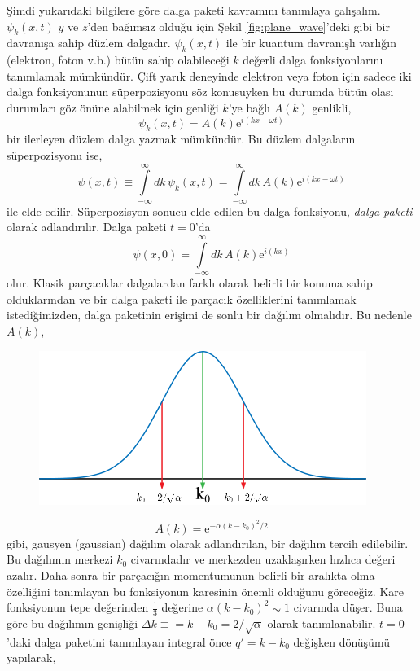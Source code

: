 \documentclass[a4paper,12pt, twoside]{article}
\begin{document}
Şimdi yukarıdaki bilgilere göre dalga paketi kavramını tanımlaya çalışalım. $\psi_k(x,t)$ $y$ ve $z$'den bağımsız olduğu için Şekil \ref{fig:plane_wave}'deki gibi bir davranışa sahip düzlem dalgadır. $\psi_k(x,t)$ ile bir kuantum davranışlı varlığın (elektron, foton v.b.) bütün sahip olabileceği $k$ değerli dalga fonksiyonlarını tanımlamak mümkündür. Çift yarık deneyinde elektron veya foton için sadece iki dalga fonksiyonunun süperpozisyonu söz konusuyken bu durumda bütün olası durumları göz önüne alabilmek için genliği $k$'ye bağlı $A(k)$ genlikli,
\begin{equation}
\psi_k(x, t) = A(k) \text{e}^{i(kx - \omega t)} 
\label{eq:plane_wave_A_k}
\end{equation}
bir ilerleyen düzlem dalga yazmak mümkündür. Bu düzlem dalgaların süperpozisyonu ise,
\begin{equation}
\psi(x, t) \equiv \int\limits_{-\infty}^{\infty}dk\,\psi_k(x, t) = \int\limits_{-\infty}^{\infty}dk\,A(k) \text{e}^{i(kx - \omega t)} 
\label{eq:wave_packet}
\end{equation}
ile elde edilir. Süperpozisyon sonucu elde edilen bu dalga fonksiyonu, \emph{dalga paketi} olarak adlandırılır. Dalga paketi $t=0$'da
\begin{equation}
\psi(x, 0) = \int\limits_{-\infty}^{\infty}dk\,A(k) \text{e}^{i(kx)} 
\label{eq:wave_packet_t0_int}
\end{equation}
olur. Klasik parçacıklar dalgalardan farklı olarak belirli bir konuma sahip olduklarından ve bir dalga paketi ile parçacık özelliklerini tanımlamak istediğimizden, dalga paketinin erişimi de sonlu bir dağılım olmalıdır. Bu nedenle $A(k)$,
\begin{figure}[hbtp]
\center
\includegraphics[scale=1.5]{Gaussian_distribution.png}
\end{figure}
\begin{equation}
A(k) = \text{e}^{-\alpha (k-k_0)^2/2}
\label{eq:wave_packet_t0}
\end{equation}
gibi, gausyen (gaussian) dağılım olarak adlandırılan, bir dağılım tercih edilebilir. Bu dağılımın merkezi $k_0$ civarındadır ve merkezden uzaklaşırken hızlıca değeri azalır. Daha sonra bir parçacığın momentumunun belirli bir aralıkta olma özelliğini tanımlayan bu fonksiyonun karesinin önemli olduğunu göreceğiz. Kare fonksiyonun tepe değerinden $\frac{1}{3}$ değerine $\alpha (k-k_0)^2\eqsim 1$ civarında düşer. Buna göre bu dağılımın genişliği $\Delta k \equiv = k-k_0 = 2/\sqrt{\alpha}$ olarak tanımlanabilir. $t=0$'daki dalga paketini tanımlayan integral önce $q' = k-k_0$ değişken dönüşümü yapılarak,
\end{document}
